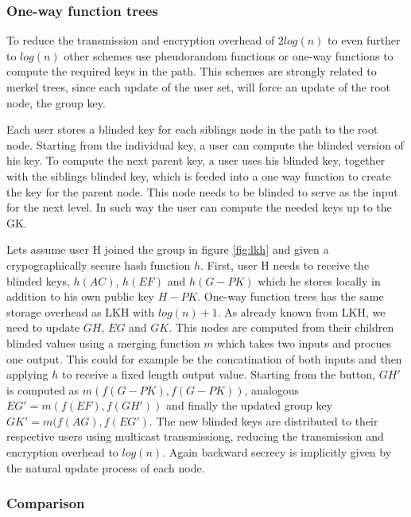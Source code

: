 \subsubsection{One-way function trees}
To reduce the transmission and encryption overhead of $2log(n)$ to even further to $log(n)$ other schemes use pheudorandom functions \cite{canetti1999multicast} or one-way functions \cite{sherman2003key} to compute the required keys in the path. This schemes are strongly related to merkel trees, since each update of the user set, will force an update of the root node, the group key.

Each user stores a blinded key for each siblings node in the path to the root node. Starting from the individual key, a user can compute the blinded version of his key. To compute the next parent key, a user uses his blinded key, together with the siblings blinded key, which is feeded into a one way function to create the key for the parent node. This node needs to be blinded to serve as the input for the next level. In such way the user can compute the needed keys up to the GK. 

Lets assume user H joined the group in figure \ref{fig:lkh} and given a crypographically secure hash function $h$. First, user H needs to receive the blinded keys, $h(AC)$, $h(EF)$ and $h(G-PK)$ which he stores locally in addition to his own public key $H-PK$. One-way function trees has the same storage overhead as LKH with $log(n) + 1$.  As already known from LKH, we need to update $GH$, $EG$ and $GK$. This nodes are computed from their children blinded values using a merging function $m$ which takes two inputs and procues one output. This could for example be the concatination of both inputs and then applying $h$ to receive a fixed length output value. Starting from the button,  $GH'$ is computed as $m(f(G-PK), f(G-PK))$, analogous $EG' = m(f(EF), f(GH'))$ and finally the updated group key $GK' = m(f(AG), f(EG')$. The new blinded keys are distributed to their respective users using multicast transmissiong, reducing the transmission and encryption overhead to $log(n)$. Again backward secrecy is implicitly given by the natural update process of each node.


\subsubsection{Comparison}

